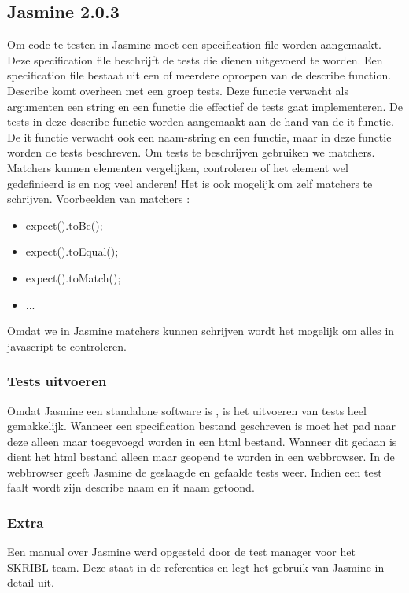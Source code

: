 \documentclass{article}
\begin{document}
\subsection{Jasmine 2.0.3}
Om code te testen in Jasmine moet een specification file worden aangemaakt. Deze specification file beschrijft de tests die dienen uitgevoerd te worden. 
\newline
Een specification file bestaat uit een of meerdere oproepen van de describe function. Describe komt overheen met een groep tests. Deze functie verwacht als argumenten een string en een functie die effectief de tests gaat implementeren.
\newline
De tests in deze describe functie worden aangemaakt aan de hand van de it functie. De it functie verwacht ook een naam-string en een functie, maar in deze functie worden de tests beschreven.
\newline
Om tests te beschrijven gebruiken we matchers. Matchers kunnen elementen vergelijken, controleren of het element wel gedefinieerd is en nog veel anderen! Het is ook mogelijk om zelf matchers te schrijven.
Voorbeelden van matchers :
\begin{itemize}
  \item expect().toBe();
  \item expect().toEqual();
  \item expect().toMatch();
  \item ...

\end{itemize}
Omdat we in Jasmine matchers kunnen schrijven wordt het mogelijk om alles in javascript te controleren.
\subsubsection{Tests uitvoeren}
Omdat Jasmine een standalone software is , is het uitvoeren van tests heel gemakkelijk. Wanneer een specification bestand geschreven is moet het pad naar deze alleen maar toegevoegd worden in een html bestand. Wanneer dit gedaan is dient het html bestand alleen maar geopend te worden in een webbrowser. In de webbrowser geeft Jasmine de geslaagde en gefaalde tests weer. Indien een test faalt wordt zijn describe naam en it naam getoond.

\subsubsection{Extra}
Een manual over Jasmine werd opgesteld door de test manager voor het SKRIBL-team. Deze staat in de referenties en legt het gebruik van Jasmine in detail uit.
\end{document}
